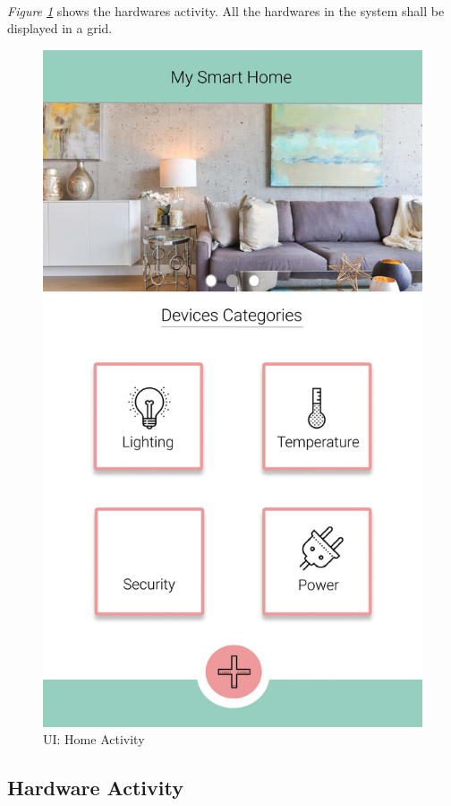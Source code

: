 \documentclass[12pt, oneside, a4paper]{book}
\begin{document}
		\paragraph{} \textit{Figure \ref{fig:activity_home}} shows the hardwares activity.  All the hardwares in the system shall be displayed in a grid.
		\begin{figure}[H]
			\centering
			\includegraphics[width=.5\linewidth]{img/activity_home.jpg}
			\caption{UI: Home Activity}
			\label{fig:activity_home}
		\end{figure}
		\newpage\subsection{Hardware Activity}
\end{document}
